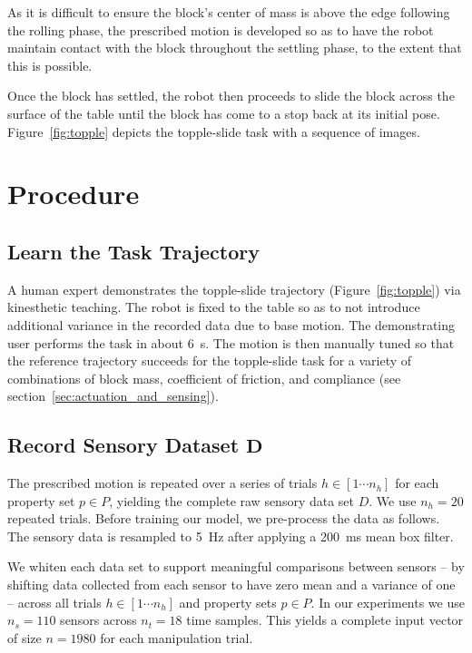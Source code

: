 As it is difficult to ensure the block's center of mass is above the edge following the rolling phase, the prescribed motion is developed so as to have the robot maintain contact with the block throughout the settling phase, to the extent that this is possible.

Once the block has settled, the robot then proceeds to slide the block across the surface of the table until the block has come to a stop back at its initial pose.
Figure~\ref{fig:topple} depicts the topple-slide task with a sequence of images.

\section{Procedure}


\subsection{Learn the Task Trajectory}

A human expert demonstrates the topple-slide trajectory (Figure~\ref{fig:topple}) via kinesthetic teaching.
The robot is fixed to the table so as to not introduce additional variance in the recorded data due to base motion.
The demonstrating user performs the task in about 6~s.  
The motion is then manually tuned so that the reference trajectory succeeds for the topple-slide task for a variety of combinations of block mass, coefficient of friction, and compliance (see section~\ref{sec:actuation_and_sensing}).

\subsection{Record Sensory Dataset $\mathbf{D}$}
\label{sec:preprocess}

The prescribed motion is repeated over a series of trials $h \in [1\cdots n_h]$ for each property set $p \in P$, yielding the complete raw sensory data set $D$. 
We use $n_h=20$ repeated trials.
Before training our model, we pre-process the data as follows.
The sensory data is resampled to 5~Hz after applying a 200~ms mean box filter. 

We whiten each data set to support meaningful comparisons between sensors -- by shifting data collected from each sensor to have zero mean and a variance of one -- across all trials $h \in [1 \cdots n_h]$ and property sets $p \in P$.  
In our experiments we use $n_s=110$ sensors across $n_t=18$ time samples.
This yields a complete input vector of size $n = 1980$ for each manipulation trial.

